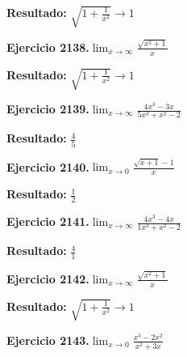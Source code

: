 \documentclass[10pt,a4paper]{article}
\begin{document}
\begin{solbox}
\textbf{Resultado:} \(\displaystyle \sqrt{1+\frac{1}{x^2}} \to 1\)
\end{solbox}

\newpage
\begin{ejbox}
\textbf{Ejercicio 2138.}\quad $\lim_{x\to \infty} \frac{\sqrt{x^2+1}}{x}$
\end{ejbox}

\begin{solbox}
\textbf{Resultado:} \(\displaystyle \sqrt{1+\frac{1}{x^2}} \to 1\)
\end{solbox}

\begin{ejbox}
\textbf{Ejercicio 2139.}\quad $\lim_{x\to \infty} \frac{4x^3 - 3x}{5x^3 + x^2 - 2}$
\end{ejbox}

\begin{solbox}
\textbf{Resultado:} \(\displaystyle \frac{4}{5}\)
\end{solbox}

\begin{ejbox}
\textbf{Ejercicio 2140.}\quad $\lim_{x\to 0} \frac{\sqrt{x+1}-1}{x}$
\end{ejbox}

\begin{solbox}
\textbf{Resultado:} \(\displaystyle \frac{1}{2}\)
\end{solbox}

\newpage
\begin{ejbox}
\textbf{Ejercicio 2141.}\quad $\lim_{x\to \infty} \frac{4x^3 - 4x}{1x^3 + x^2 - 2}$
\end{ejbox}

\begin{solbox}
\textbf{Resultado:} \(\displaystyle \frac{4}{1}\)
\end{solbox}

\begin{ejbox}
\textbf{Ejercicio 2142.}\quad $\lim_{x\to \infty} \frac{\sqrt{x^2+1}}{x}$
\end{ejbox}

\begin{solbox}
\textbf{Resultado:} \(\displaystyle \sqrt{1+\frac{1}{x^2}} \to 1\)
\end{solbox}

\begin{ejbox}
\textbf{Ejercicio 2143.}\quad $\lim_{x\to 0} \frac{x^3-2x^2}{x^2+3x}$
\end{ejbox}
\end{document}
